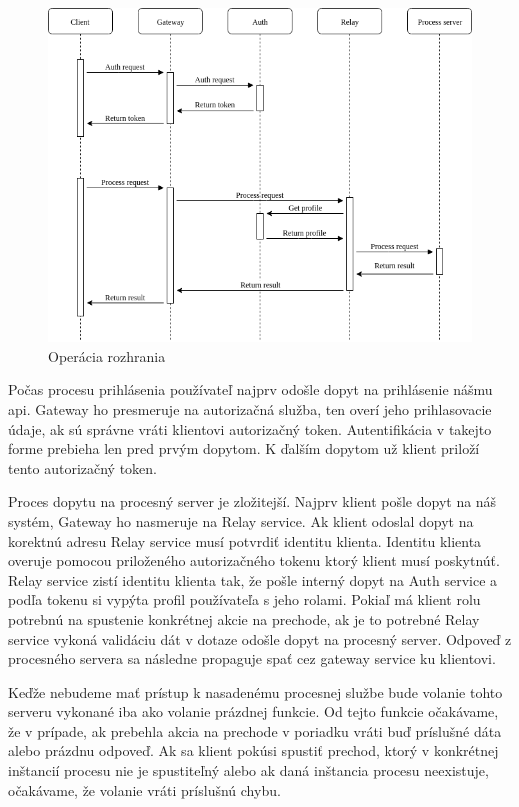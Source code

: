 \begin{figure}[!htbp]
	\centering
	\includegraphics[width=14cm]{img/api_operation.png}
	\caption{Operácia rozhrania}
	\label{api_operation}
\end{figure}

Počas procesu prihlásenia používateľ najprv odošle dopyt na prihlásenie nášmu \acrshort{api}.  Gateway ho presmeruje na autorizačná služba, ten overí jeho prihlasovacie údaje, ak sú správne vráti klientovi autorizačný token. Autentifikácia v takejto forme prebieha len pred prvým dopytom. K ďalším dopytom už klient priloží tento autorizačný token. 

Proces dopytu na procesný server je zložitejší. Najprv klient pošle dopyt na náš systém, Gateway ho nasmeruje na Relay service. Ak klient odoslal dopyt na korektnú adresu Relay service musí potvrdiť identitu klienta. Identitu klienta overuje pomocou priloženého autorizačného tokenu ktorý klient musí poskytnúť. Relay service zistí identitu klienta tak, že pošle interný dopyt na  Auth service a podľa tokenu si vypýta profil používateľa s jeho rolami.  Pokiaľ má klient rolu potrebnú na spustenie konkrétnej akcie na prechode, ak je to potrebné Relay service vykoná validáciu dát  v dotaze odošle dopyt na procesný server.  Odpoveď z procesného servera sa následne propaguje spať cez gateway service ku klientovi.
 
Keďže nebudeme mať prístup k nasadenému procesnej službe bude volanie tohto serveru vykonané iba ako volanie prázdnej funkcie. Od tejto funkcie očakávame, že v prípade, ak prebehla akcia na prechode v poriadku vráti buď príslušné dáta alebo prázdnu odpoveď.  Ak sa klient pokúsi spustiť prechod, ktorý v konkrétnej inštancií procesu nie je spustiteľný alebo ak daná inštancia procesu neexistuje, očakávame, že volanie vráti príslušnú chybu. 

